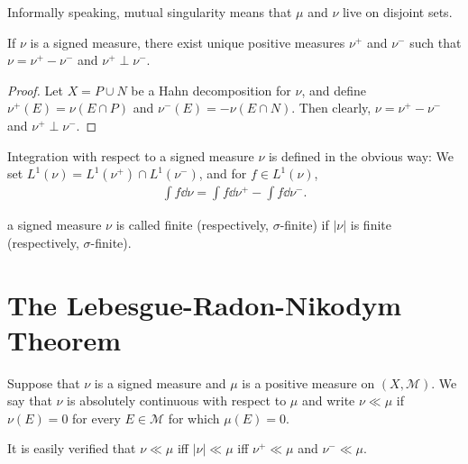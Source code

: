 Informally speaking, mutual singularity means that $\mu$ and $\nu$ live on disjoint sets.

\begin{theorem}
    If $\nu$ is a signed measure, there exist unique positive measures $\nu^+$ and $\nu^-$ such that $\nu = \nu^+ - \nu^-$ and $\nu^+ \perp \nu^-$.
\end{theorem}

\begin{proof}
    Let $X = P \cup N$ be a Hahn decomposition for $\nu$, and define $\nu^{+}(E) = \nu(E \cap P)$ and $\nu^{-}(E) = -\nu(E \cap N)$.
    Then clearly, $\nu = \nu^{+} - \nu^{-}$ and $\nu^+ \perp \nu^-$.
\end{proof}



Integration with respect to a signed measure $\nu$ is defined in the obvious way:
We set $L^{1}(\nu) = L^{1}(\nu^+) \cap L^{1}(\nu^-)$, and for $f \in L^{1}(\nu)$,
\begin{align}
    \int f \dd \nu = \int f \dd \nu^+ - \int f \dd \nu^-.
\end{align}

a signed measure $\nu$ is called finite (respectively, $\sigma$-finite) if $|\nu|$ is finite (respectively, $\sigma$-finite).

\section{The Lebesgue-Radon-Nikodym Theorem}

\begin{definition}
    Suppose that $\nu$ is a signed measure and $\mu$ is a positive measure on $(X, \mathcal{M})$.
    We say that $\nu$ is absolutely continuous with respect to $\mu$ and write $\nu \ll \mu$ if $\nu(E) = 0$ for every $E \in \mathcal{M}$ for which $\mu(E) = 0$.
\end{definition}

It is easily verified that $\nu \ll \mu$ iff $|\nu| \ll \mu$ iff $\nu^+ \ll \mu$ and $\nu^- \ll \mu$.